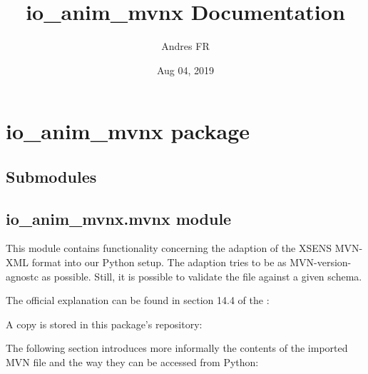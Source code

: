 \documentclass[letterpaper,10pt,english,openany,oneside]{sphinxmanual}
\title{io\_anim\_mvnx Documentation}
\date{Aug 04, 2019}
\author{Andres FR}
\begin{document}
\pagestyle{empty}
\sphinxmaketitle
\pagestyle{plain}
\sphinxtableofcontents
\pagestyle{normal}
\label{\detokenize{index::doc}}



\chapter{io\_anim\_mvnx package}
\label{\detokenize{io_anim_mvnx:io-anim-mvnx-package}}\label{\detokenize{io_anim_mvnx::doc}}

\section{Submodules}
\label{\detokenize{io_anim_mvnx:submodules}}

\section{io\_anim\_mvnx.mvnx module}
\label{\detokenize{io_anim_mvnx:module-io_anim_mvnx.mvnx}}\label{\detokenize{io_anim_mvnx:io-anim-mvnx-mvnx-module}}
This module contains functionality concerning the adaption of the
XSENS MVN-XML format into our Python setup.
The adaption tries to be as MVN-version-agnostc as possible. Still,
it is possible to validate the file against a given schema.

The official explanation can be found in section 14.4 of the
:
\begin{quote}

\end{quote}

A copy is stored in this package’s repository:
\begin{quote}

\end{quote}

The following section introduces more informally the contents of the imported
MVN file and the way they can be accessed from Python:
\end{document}
